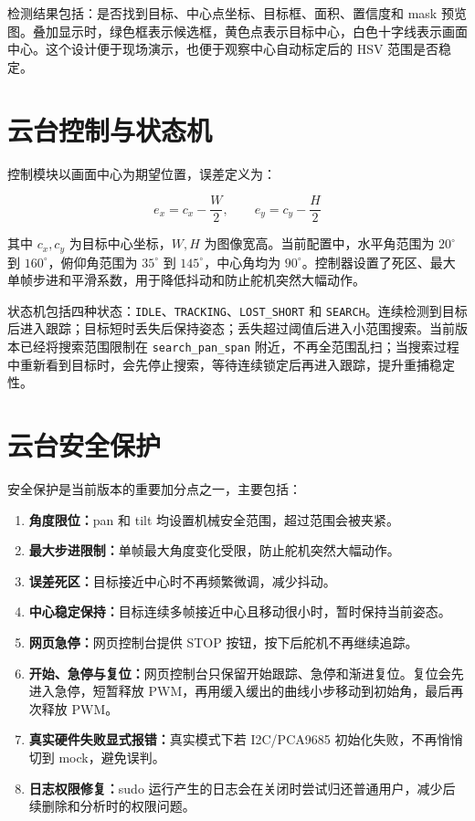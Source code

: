 \documentclass[
  oneside,
  degree=bachelor,
  field=science,
  fullwidthstop=circle,
  fontset=windows,
  times=false,
  minted=false,
  biblatex=false,
  algo=algpseudocode,
]{tongjithesis}
\newcommand{\code}[1]{\texttt{#1}}
\begin{document}
检测结果包括：是否找到目标、中心点坐标、目标框、面积、置信度和 mask 预览图。叠加显示时，绿色框表示候选框，黄色点表示目标中心，白色十字线表示画面中心。这个设计便于现场演示，也便于观察中心自动标定后的 HSV 范围是否稳定。

\section{云台控制与状态机}

控制模块以画面中心为期望位置，误差定义为：

\begin{equation}
  e_x = c_x - \frac{W}{2}, \qquad e_y = c_y - \frac{H}{2}
\end{equation}

其中 $c_x,c_y$ 为目标中心坐标，$W,H$ 为图像宽高。当前配置中，水平角范围为 $20^\circ$ 到 $160^\circ$，俯仰角范围为 $35^\circ$ 到 $145^\circ$，中心角均为 $90^\circ$。控制器设置了死区、最大单帧步进和平滑系数，用于降低抖动和防止舵机突然大幅动作。

状态机包括四种状态：\code{IDLE}、\code{TRACKING}、\code{LOST\_SHORT} 和 \code{SEARCH}。连续检测到目标后进入跟踪；目标短时丢失后保持姿态；丢失超过阈值后进入小范围搜索。当前版本已经将搜索范围限制在 \code{search\_pan\_span} 附近，不再全范围乱扫；当搜索过程中重新看到目标时，会先停止搜索，等待连续锁定后再进入跟踪，提升重捕稳定性。

\section{云台安全保护}

安全保护是当前版本的重要加分点之一，主要包括：

\begin{enumerate}
  \item \textbf{角度限位：}pan 和 tilt 均设置机械安全范围，超过范围会被夹紧。
  \item \textbf{最大步进限制：}单帧最大角度变化受限，防止舵机突然大幅动作。
  \item \textbf{误差死区：}目标接近中心时不再频繁微调，减少抖动。
  \item \textbf{中心稳定保持：}目标连续多帧接近中心且移动很小时，暂时保持当前姿态。
  \item \textbf{网页急停：}网页控制台提供 STOP 按钮，按下后舵机不再继续追踪。
  \item \textbf{开始、急停与复位：}网页控制台只保留开始跟踪、急停和渐进复位。复位会先进入急停，短暂释放 PWM，再用缓入缓出的曲线小步移动到初始角，最后再次释放 PWM。
  \item \textbf{真实硬件失败显式报错：}真实模式下若 I2C/PCA9685 初始化失败，不再悄悄切到 mock，避免误判。
  \item \textbf{日志权限修复：}sudo 运行产生的日志会在关闭时尝试归还普通用户，减少后续删除和分析时的权限问题。
\end{enumerate}
\end{document}
